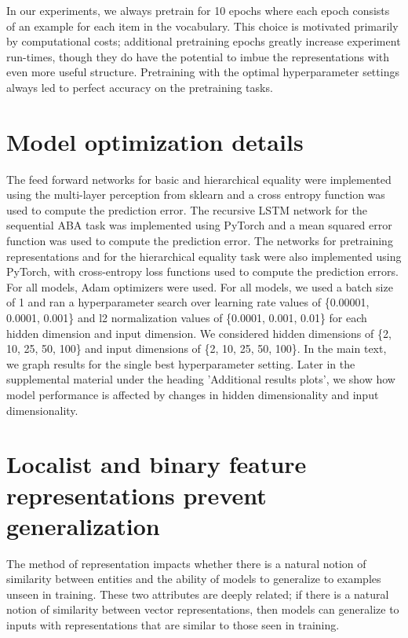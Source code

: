 In our experiments, we always pretrain for 10 epochs where each epoch consists of an example for each item in the vocabulary. This choice is motivated primarily by computational costs; additional pretraining epochs greatly increase experiment run-times, though they do have the potential to imbue the representations with even more useful structure. Pretraining with the optimal hyperparameter settings always led to perfect accuracy on the pretraining tasks.


\section{Model optimization details}\label{app:optimization}

The feed forward networks for basic and hierarchical equality were implemented using the multi-layer perception from sklearn and a cross entropy function was used to compute the prediction error. The recursive LSTM network for the sequential ABA task was implemented using PyTorch and a mean squared error function was used to compute the prediction error. The networks for pretraining representations and for the hierarchical equality task were also implemented using PyTorch, with cross-entropy loss functions used to compute the prediction errors. For all models, Adam optimizers \citep{Kingma:Ba:2015} were used. For all models, we used a batch size of 1 and ran a hyperparameter search over learning rate values of \{0.00001, 0.0001, 0.001\} and l2 normalization values of \{0.0001, 0.001, 0.01\} for each hidden dimension and input dimension. We considered hidden dimensions of \{2, 10, 25, 50, 100\} and input dimensions of \{2, 10, 25, 50, 100\}. In the main text, we graph results for the single best hyperparameter setting. Later in the supplemental material under the heading 'Additional results plots', we show how model performance is affected by changes in hidden dimensionality and input dimensionality.


\section{Localist and binary feature representations prevent generalization}\label{app:generalization}

The method of representation impacts whether there is a natural notion of similarity between entities and the ability of models to generalize to examples unseen in training. These two attributes are deeply related; if there is a natural notion of similarity between vector representations, then models can generalize to inputs with representations that are similar to those seen in training.

